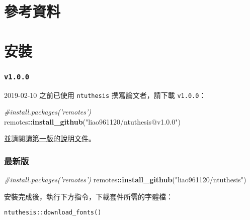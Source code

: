 \documentclass[oneside]{book}
\newenvironment{Shaded}{\begin{snugshade}}{\end{snugshade}}
\newcommand{\CommentTok}[1]{\textcolor[rgb]{0.56,0.35,0.01}{\textit{#1}}}
\newcommand{\KeywordTok}[1]{\textcolor[rgb]{0.13,0.29,0.53}{\textbf{#1}}}
\newcommand{\NormalTok}[1]{#1}
\newcommand{\OperatorTok}[1]{\textcolor[rgb]{0.81,0.36,0.00}{\textbf{#1}}}
\newcommand{\StringTok}[1]{\textcolor[rgb]{0.31,0.60,0.02}{#1}}
\let\oldhref=\href
\renewcommand{\href}[2]{#2\footnote{\url{#1}}}
\begin{document}
\renewcommand{\href}{\oldhref}

\hypertarget{references}{%
\chapter*{參考資料}\label{references}}

\hypertarget{install}{%
\chapter{安裝}\label{install}}

\hypertarget{v1.0.0-1}{%
\subsection*{\texorpdfstring{\texttt{v1.0.0}}{v1.0.0}}\label{v1.0.0-1}}

2019-02-10 之前已使用 \texttt{ntuthesis} 撰寫論文者，請下載 \texttt{v1.0.0}：

\begin{Shaded}
\begin{Highlighting}[]
\CommentTok{#install.packages('remotes')}
\NormalTok{remotes}\OperatorTok{::}\KeywordTok{install_github}\NormalTok{(}\StringTok{"liao961120/ntuthesis@v1.0.0"}\NormalTok{)}
\end{Highlighting}
\end{Shaded}

並請閱讀\href{https://liao961120.github.io/ntuthesis/doc-v1}{第一版的說明文件}。

\hypertarget{ux6700ux65b0ux7248-1}{%
\subsection*{最新版}\label{ux6700ux65b0ux7248-1}}

\begin{Shaded}
\begin{Highlighting}[]
\CommentTok{#install.packages('remotes')}
\NormalTok{remotes}\OperatorTok{::}\KeywordTok{install_github}\NormalTok{(}\StringTok{"liao961120/ntuthesis"}\NormalTok{)}
\end{Highlighting}
\end{Shaded}

安裝完成後，執行下方指令，下載套件所需的字體檔：

\begin{verbatim}
ntuthesis::download_fonts()
\end{verbatim}
\end{document}
